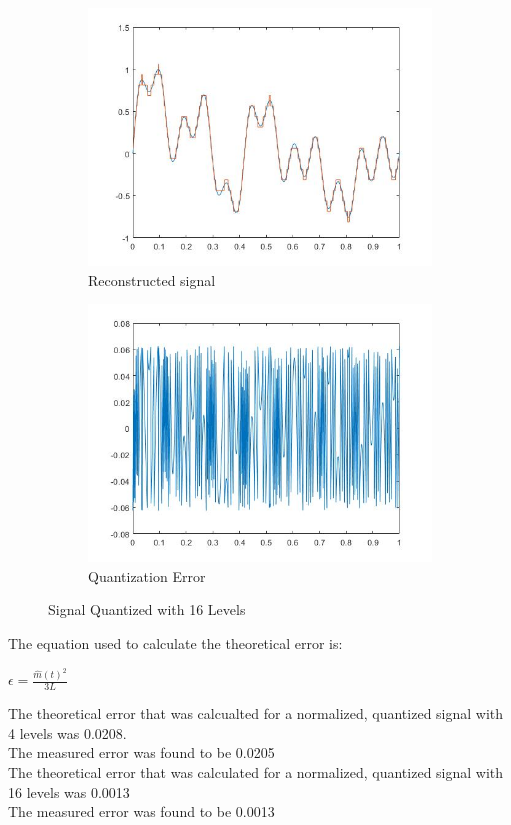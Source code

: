 \documentclass{article}
\begin{document}
\begin{figure}[H]
  \begin{center}
    \begin{subfigure}[b]{0.4\linewidth}
      \includegraphics[width = \linewidth]{PCM_16.jpg}
      \caption{Reconstructed signal}
    \end{subfigure}
    \begin{subfigure}[b]{0.4\linewidth}
      \includegraphics[width = \linewidth]{PCM_16_Error.jpg}
      \caption{Quantization Error}
    \end{subfigure}
    \caption{Signal Quantized with 16 Levels}
    \label{fig:figure2}
  \end{center}
\end{figure}
\noindent
The equation used to calculate the theoretical error is:
\Large
\begin{center}
$ \epsilon = \frac{\hat{m}(t)^2}{3L}$
\end{center}
\normalsize
\noindent
The theoretical error that was calcualted for a normalized, quantized signal with 4 levels was 0.0208.\\
The measured error was found to be 0.0205\\
The theoretical error that was calculated for a normalized, quantized signal with 16 levels was 0.0013\\
The measured error was found to be 0.0013\\
\end{document}
